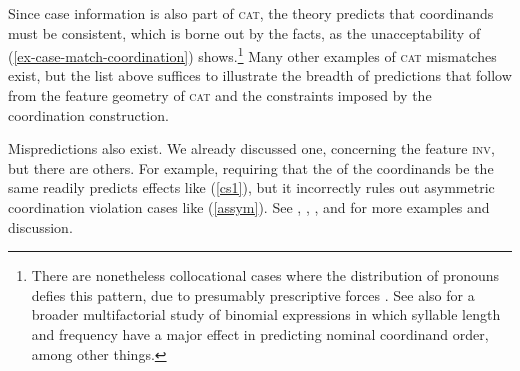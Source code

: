 \noindent
Since case information is also part of \textsc{cat},  the theory
predicts that coordinands must be consistent, which is borne out by the
facts, as the unacceptability of  (\ref{ex-case-match-coordination}) shows.\footnote{There are nonetheless collocational cases where the distribution of pronouns defies this pattern, due to presumably prescriptive forces \citep{grano}. See also \citet[105, 107]{binomial} for a broader multifactorial study of binomial expressions in which syllable length and  frequency have a major effect in predicting nominal coordinand order, among other things.}
 Many other examples of \textsc{cat} mismatches exist, but the  list above suffices to
illustrate the breadth of predictions that follow from the feature geometry of \textsc{cat} and the constraints imposed by
the coordination construction.

\eal
\label{ex-case-match-coordination}
\zl




Mispredictions also exist. We already discussed one, concerning the feature \textsc{inv}, but there are others. For example, requiring that the \slashv of the coordinands be the same readily predicts  effects like 
(\ref{cs1}), but it incorrectly rules out asymmetric coordination violation cases like (\ref{assym}). 
See \citet{goldsmith}, \citet{lakoff86}, \citet{levinprince86}, and \citet{kehler} for more examples and discussion.


\eal
\label{cs1}


\zl



